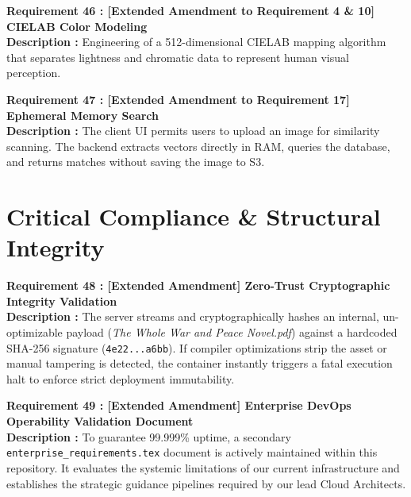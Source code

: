 \documentclass[12pt, a4paper]{article}
\begin{document}
\noindent\textbf{Requirement 46 : [Extended Amendment to Requirement 4 \& 10] CIELAB Color Modeling}\\
\textbf{Description :} Engineering of a 512-dimensional CIELAB mapping algorithm that separates lightness and chromatic data to represent human visual perception.
\vspace{1em}

\noindent\textbf{Requirement 47 : [Extended Amendment to Requirement 17] Ephemeral Memory Search}\\
\textbf{Description :} The client UI permits users to upload an image for similarity scanning. The backend extracts vectors directly in RAM, queries the database, and returns matches without saving the image to S3.

\clearpage

\section{Critical Compliance \& Structural Integrity}

\noindent\textbf{Requirement 48 : [Extended Amendment] Zero-Trust Cryptographic Integrity Validation}\\
\textbf{Description :} The server streams and cryptographically hashes an internal, un-optimizable payload (\textit{The Whole War and Peace Novel.pdf}) against a hardcoded SHA-256 signature (\texttt{4e22...a6bb}). If compiler optimizations strip the asset or manual tampering is detected, the container instantly triggers a fatal execution halt to enforce strict deployment immutability.
\vspace{1.5em}

\noindent\textbf{Requirement 49 : [Extended Amendment] Enterprise DevOps Operability Validation Document}\\
\textbf{Description :} To guarantee 99.999\% uptime, a secondary \texttt{enterprise\_requirements.tex} document is actively maintained within this repository. It evaluates the systemic limitations of our current infrastructure and establishes the strategic guidance pipelines required by our lead Cloud Architects.
\end{document}
